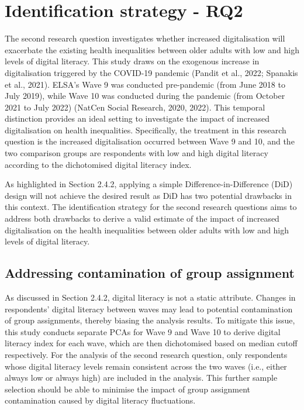 \section{Identification strategy - RQ2}
The second research question investigates whether increased digitalisation will exacerbate the existing health inequalities between older adults with low and high levels of digital literacy. This study draws on the exogenous increase in digitalisation triggered by the COVID-19 pandemic (Pandit et al., 2022; Spanakis et al., 2021). ELSA's Wave 9 was conducted pre-pandemic (from June 2018 to July 2019), while Wave 10 was conducted during the pandemic (from October 2021 to July 2022) (NatCen Social Research, 2020, 2022). This temporal distinction provides an ideal setting to investigate the impact of increased digitalisation on health inequalities. Specifically, the treatment in this research question is the increased digitalisation occurred between Wave 9 and 10, and the two comparison groups are respondents with low and high digital literacy according to the dichotomised digital literacy index.

As highlighted in Section 2.4.2, applying a simple Difference-in-Difference (DiD) design will not achieve the desired result as DiD has two potential drawbacks in this context. The identification strategy for the second research questions aims to address both drawbacks to derive a valid estimate of the impact of increased digitalisation on the health inequalities between older adults with low and high levels of digital literacy.

\subsection{Addressing contamination of group assignment}
As discussed in Section 2.4.2, digital literacy is not a static attribute. Changes in respondents' digital literacy between waves may lead to potential contamination of group assignments, thereby biasing the analysis results. To mitigate this issue, this study conducts separate PCAs for Wave 9 and Wave 10 to derive digital literacy index for each wave, which are then dichotomised based on median cutoff respectively. For the analysis of the second research question, only respondents whose digital literacy levels remain consistent across the two waves (i.e., either always low or always high) are included in the analysis. This further sample selection should be able to minimise the impact of group assignment contamination caused by digital literacy fluctuations.

